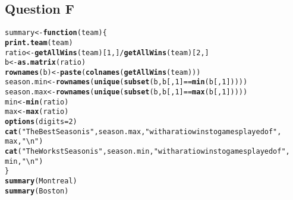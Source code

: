 \documentclass[12pt,letterpaper]{article}\usepackage[]{graphicx}\usepackage[]{color}
\makeatletter
\newcommand{\hlnum}[1]{\textcolor[rgb]{0.686,0.059,0.569}{#1}}%
\newcommand{\hlstr}[1]{\textcolor[rgb]{0.192,0.494,0.8}{#1}}%
\newcommand{\hlopt}[1]{\textcolor[rgb]{0,0,0}{#1}}%
\newcommand{\hlstd}[1]{\textcolor[rgb]{0.345,0.345,0.345}{#1}}%
\newcommand{\hlkwa}[1]{\textcolor[rgb]{0.161,0.373,0.58}{\textbf{#1}}}%
\newcommand{\hlkwb}[1]{\textcolor[rgb]{0.69,0.353,0.396}{#1}}%
\newcommand{\hlkwc}[1]{\textcolor[rgb]{0.333,0.667,0.333}{#1}}%
\newcommand{\hlkwd}[1]{\textcolor[rgb]{0.737,0.353,0.396}{\textbf{#1}}}%
\newenvironment{kframe}{%
 \def\at@end@of@kframe{}%
 \ifinner\ifhmode%
  \def\at@end@of@kframe{\end{minipage}}%
  \begin{minipage}{\columnwidth}%
 \fi\fi%
 \def\FrameCommand##1{\hskip\@totalleftmargin \hskip-\fboxsep
 \colorbox{shadecolor}{##1}\hskip-\fboxsep
     \hskip-\linewidth \hskip-\@totalleftmargin \hskip\columnwidth}%
 \MakeFramed {\advance\hsize-\width
   \@totalleftmargin\z@ \linewidth\hsize
   \@setminipage}}%
 {\par\unskip\endMakeFramed%
 \at@end@of@kframe}
\newenvironment{knitrout}{}{} %
\makeatother
\begin{document}
\newpage
\subsection{Question F}
\begin{knitrout}
\color{fgcolor}\begin{kframe}
\begin{alltt}
\hlstd{summary} \hlkwb{<-} \hlkwa{function}\hlstd{(}\hlkwc{team}\hlstd{)\{}
  \hlkwd{print.team}\hlstd{(team)}
  \hlstd{ratio} \hlkwb{<-} \hlkwd{getAllWins}\hlstd{(team)[}\hlnum{1}\hlstd{,]}\hlopt{/}\hlkwd{getAllWins}\hlstd{(team)[}\hlnum{2}\hlstd{,]}
  \hlstd{b} \hlkwb{<-} \hlkwd{as.matrix}\hlstd{(ratio)}
  \hlkwd{rownames}\hlstd{(b)} \hlkwb{<-} \hlkwd{paste}\hlstd{(}\hlkwd{colnames}\hlstd{(}\hlkwd{getAllWins}\hlstd{(team)))}
  \hlstd{season.min} \hlkwb{<-} \hlkwd{rownames}\hlstd{(}\hlkwd{unique}\hlstd{(}\hlkwd{subset}\hlstd{(b,b[,}\hlnum{1}\hlstd{]}\hlopt{==}\hlkwd{min}\hlstd{(b[,}\hlnum{1}\hlstd{]))))}
  \hlstd{season.max} \hlkwb{<-} \hlkwd{rownames}\hlstd{(}\hlkwd{unique}\hlstd{(}\hlkwd{subset}\hlstd{(b,b[,}\hlnum{1}\hlstd{]}\hlopt{==}\hlkwd{max}\hlstd{(b[,}\hlnum{1}\hlstd{]))))}
  \hlstd{min} \hlkwb{<-} \hlkwd{min}\hlstd{(ratio)}
  \hlstd{max} \hlkwb{<-} \hlkwd{max}\hlstd{(ratio)}
  \hlkwd{options}\hlstd{(}\hlkwc{digits}\hlstd{=}\hlnum{2}\hlstd{)}
  \hlkwd{cat}\hlstd{(}\hlstr{"The Best Season is "}\hlstd{, season.max,} \hlstr{"with a ratio wins to games played of"}\hlstd{,}
      \hlstd{max,}\hlstr{"\textbackslash{}n"}\hlstd{)}
  \hlkwd{cat}\hlstd{(}\hlstr{"The Workst Season is "}\hlstd{, season.min,} \hlstr{"with a ratio wins to games played of"}\hlstd{,}
      \hlstd{min,}\hlstr{"\textbackslash{}n"}\hlstd{)}
\hlstd{\}}
\hlkwd{summary}\hlstd{(Montreal)}
\hlkwd{summary}\hlstd{(Boston)}
\end{alltt}
\end{kframe}
\end{knitrout}
\end{document}

